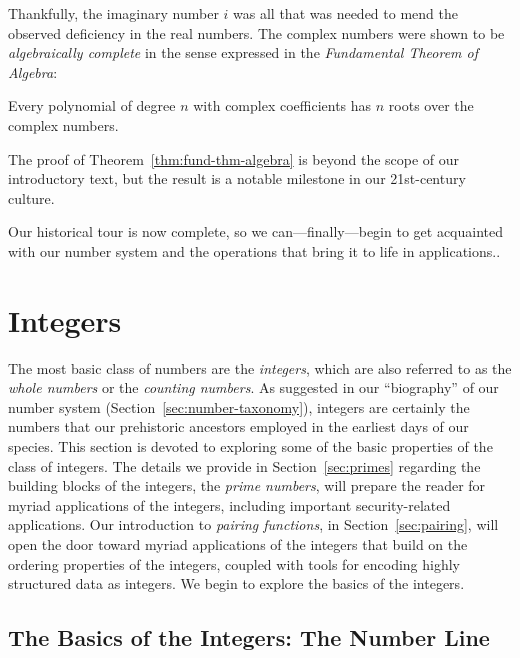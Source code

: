 Thankfully, the imaginary number $i$ was all that was needed to mend
the observed deficiency in the real numbers.  The complex numbers were
shown to be {\it algebraically complete}
in the sense expressed in the {\it Fundamental Theorem of Algebra}:

\begin{theorem}
\label{thm:fund-thm-algebra}
Every polynomial of degree $n$ with complex coefficients has $n$ roots
over the complex numbers.
\end{theorem}

The proof of Theorem~\ref{thm:fund-thm-algebra} is beyond the scope of
our introductory text, but the result is a notable milestone in our
21st-century culture.

Our historical tour is now complete, so we can---finally---begin to
get acquainted with our number system and the operations that bring it
to life in applications..

\section{Integers}
\label{sec:integers}

The most basic class of numbers are the {\it integers},
which are also referred to as the {\it whole numbers}
or the {\em counting numbers}.
%
As suggested in our ``biography'' of our number system
(Section~\ref{sec:number-taxonomy}), integers are certainly the
numbers that our prehistoric ancestors employed in the earliest days
of our species.  This section is devoted to exploring some of the
basic properties of the class of integers.  The details we provide in
Section~\ref{sec:primes} regarding the building blocks of the
integers, the {\it prime numbers}, 
will prepare the reader for myriad applications of the integers,
including important security-related applications.  Our introduction
to {\it pairing functions},
in Section~\ref{sec:pairing}, will open the door toward myriad 
applications of the integers that build on the ordering properties of
the integers, coupled with tools for encoding highly structured data
as integers.  We begin to explore the basics of the integers.

\subsection{The Basics of the Integers: The Number Line}
\label{sec:number-line}

